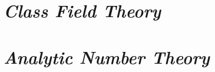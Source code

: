 \documentclass[10pt, a4paper]{book}
\begin{document}
\maketitle
\makecontents




\part{\emph{Class Field Theory}}




\part{\emph{Analytic Number Theory}}

\end{document}
